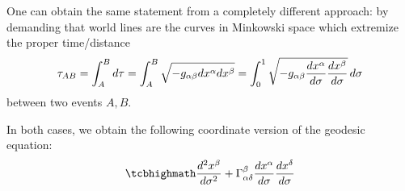 One can obtain the same statement from a completely different approach: by demanding that world lines are the curves in Minkowski space which extremize the proper time/distance
\begin{equation}
\tau_{AB} = \int_A^B d\tau = \int_A^B \sqrt{- g_{\alpha \beta} dx^\alpha dx^\beta} = \int_0^1 \sqrt{- g_{\alpha \beta} \dv{x^\alpha}{\sigma} \dv{x^\beta}{\sigma}} \, d\sigma
\end{equation}
between two events $A, B$.

In both cases, we obtain the following coordinate version of the geodesic equation:
\begin{equation}
\eqbox{
\dv[2]{x^\beta}{\sigma} + \Gamma_{\alpha \delta}^\beta \dv{x^\alpha}{\sigma} \dv{x^\delta}{\sigma}
}
\end{equation}

